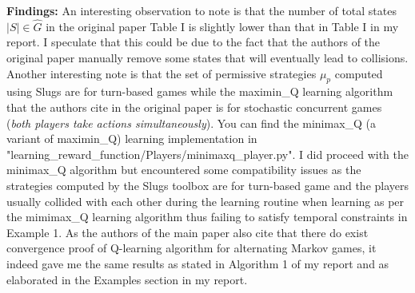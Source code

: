 \documentclass[11pt]{article}
\begin{document}
        \textbf{Findings: }An interesting observation to note is that the number of total states $|S| \in \hat{G}$ in the original paper Table I is slightly lower than that in Table I in my report. I speculate that this could be due to the fact that the authors of the original paper manually remove some states that will eventually lead to collisions. Another interesting note is that the set of permissive strategies $\mu_p$ computed using Slugs are for turn-based games while the maximin\_Q learning algorithm that the authors cite in the original paper is for stochastic concurrent games (\textit{both players take actions simultaneously}). You can find the minimax\_Q (a variant of maximin\_Q) learning implementation in "learning\_reward\_function/Players/minimaxq\_player.py".  I did proceed with the minimax\_Q algorithm but encountered some compatibility issues as the strategies computed by the Slugs toolbox are for turn-based game and the players usually collided with each other during the learning routine when learning as per the mimimax\_Q learning algorithm thus failing to satisfy temporal constraints in Example 1. As the authors of the main paper also cite that there do exist convergence proof of Q-learning algorithm for alternating Markov games, it indeed gave me the same results as stated in Algorithm 1 of my report and as elaborated in the Examples section in my report. 
        
        
\end{document}
